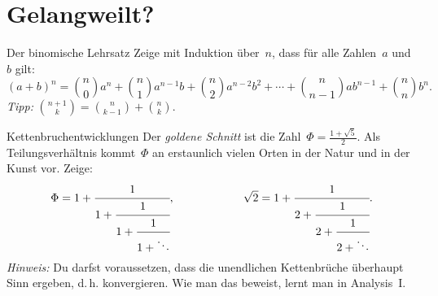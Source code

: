 \documentclass{../zirkelblatt1415}
\begin{document}
\pagestyle{empty}

\vspace*{-2cm}
\enlargethispage{2cm}

\section*{Gelangweilt?}

\begin{aufgabe}{Der binomische Lehrsatz}
Zeige mit Induktion über~$n$, dass für alle Zahlen~$a$ und~$b$ gilt:
\[ (a + b)^n =
  \binom{n}{0} a^n +
  \binom{n}{1} a^{n-1} b +
  \binom{n}{2} a^{n-2} b^2 + \cdots +
  \binom{n}{n-1} a b^{n-1} +
  \binom{n}{n} b^n. \]
\emph{Tipp:} $\binom{n+1}{k} = \binom{n}{k-1} + \binom{n}{k}$.
\end{aufgabe}

\begin{aufgabe}{Kettenbruchentwicklungen}
Der \emph{goldene Schnitt} ist die Zahl~$\Phi = \frac{1 + \sqrt{5}}{2}$. Als
Teilungsverhältnis kommt~$\Phi$ an erstaunlich vielen Orten in der Natur und in
der Kunst vor. Zeige:
\[ \Phi = 1 + \cfrac{1}{1 + \cfrac{1}{1 + \cfrac{1}{1 + \ddots}}},
  \qquad\qquad\qquad
  \sqrt{2} = 1 + \cfrac{1}{2 + \cfrac{1}{2 + \cfrac{1}{2 + \ddots}}}. \]
\emph{Hinweis:} Du darfst voraussetzen, dass die unendlichen Kettenbrüche
überhaupt Sinn ergeben, d.\,h. konvergieren. Wie man das beweist, lernt man in
Analysis~I.
\end{aufgabe}
\end{document}
